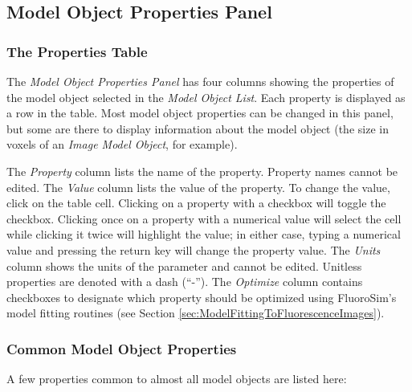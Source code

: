 \documentclass[11pt,titlepage,twoside]{article}
\begin{document}
\subsection{Model Object Properties Panel}

\subsubsection{The Properties Table}

The \emph{Model Object Properties Panel} has four columns showing the properties of the model object selected in the \emph{Model Object List}. Each property is displayed as a row in the table. Most model object properties can be changed in this panel, but some are there to display information about the model object (the size in voxels of an \emph{Image Model Object}, for example).

The \emph{Property} column lists the name of the property. Property names cannot be edited. The \emph{Value} column lists the value of the property. To change the value, click on the table cell. Clicking on a property with a checkbox will toggle the checkbox. Clicking once on a property with a numerical value will select the cell while clicking it twice will highlight the value; in either case, typing a numerical value and pressing the return key will change the property value. The \emph{Units} column shows the units of the parameter and cannot be edited. Unitless properties are denoted with a dash (``-''). The \emph{Optimize} column contains checkboxes to designate which property should be optimized using FluoroSim's model fitting routines (see Section \ref{sec:ModelFittingToFluorescenceImages}).

\subsubsection{Common Model Object Properties}

A few properties common to almost all model objects are listed here:
\end{document}
